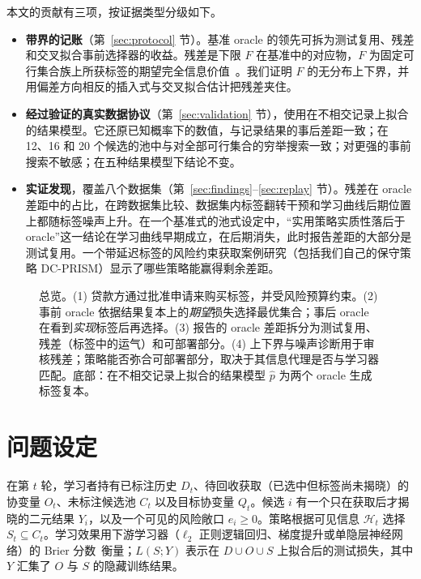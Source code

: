 \documentclass[runningheads]{llncs}
\begin{document}
本文的贡献有三项，按证据类型分级如下。
\begin{itemize}
\item \textbf{带界的记账}（第~\ref{sec:protocol} 节）。基准 oracle 的领先可拆为测试复用、残差和交叉拟合事前选择器的收益。残差是下限 $F$ 在基准中的对应物，$F$ 为固定可行集合族上所获标签的期望完全信息价值~\cite{howard1966information}。我们证明 $F$ 的无分布上下界，并用偏差方向相反的插入式与交叉拟合估计把残差夹住。
\item \textbf{经过验证的真实数据协议}（第~\ref{sec:validation} 节），使用在不相交记录上拟合的结果模型。它还原已知概率下的数值，与记录结果的事后差距一致；在 12、16 和 20 个候选的池中与对全部可行集合的穷举搜索一致；对更强的事前搜索不敏感；在五种结果模型下结论不变。
\item \textbf{实证发现}，覆盖八个数据集（第~\ref{sec:findings}--\ref{sec:replay} 节）。残差在 oracle 差距中的占比，在跨数据集比较、数据集内标签翻转干预和学习曲线后期位置上都随标签噪声上升。在一个基准式的池式设定中，“实用策略实质性落后于 oracle”这一结论在学习曲线早期成立，在后期消失，此时报告差距的大部分是测试复用。一个带延迟标签的风险约束获取案例研究（包括我们自己的保守策略 DC-PRISM）显示了哪些策略能赢得剩余差距。
\end{itemize}

\begin{figure}[t]
 \centering
 \resizebox{\linewidth}{!}{}
 \caption{总览。(1) 贷款方通过批准申请来购买标签，并受风险预算约束。(2) 事前 oracle 依据结果复本上的\emph{期望}损失选择最优集合；事后 oracle 在看到\emph{实现}标签后再选择。(3) 报告的 oracle 差距拆分为测试复用、残差（标签中的运气）和可部署部分。(4) 上下界与噪声诊断用于审核残差；策略能否弥合可部署部分，取决于其信息代理是否与学习器匹配。底部：在不相交记录上拟合的结果模型 $\hat p$ 为两个 oracle 生成标签复本。}
 \label{fig:framework}
\end{figure}

\section{问题设定}
\label{sec:setting}
在第 $t$ 轮，学习者持有已标注历史 $D_t$、待回收获取（已选中但标签尚未揭晓）的协变量 $O_t$、未标注候选池 $C_t$ 以及目标协变量 $Q_t$。候选 $i$ 有一个只在获取后才揭晓的二元结果 $Y_i$，以及一个可见的风险敞口 $e_i\ge0$。策略根据可见信息 $\mathcal H_t$ 选择 $S_t\subseteq C_t$。学习效果用下游学习器（$\ell_2$ 正则逻辑回归、梯度提升或单隐层神经网络）的 Brier 分数~\cite{brier1950verification}衡量；$L(S;Y)$ 表示在 $D\cup O\cup S$ 上拟合后的测试损失，其中 $Y$ 汇集了 $O$ 与 $S$ 的隐藏训练结果。
\end{document}
